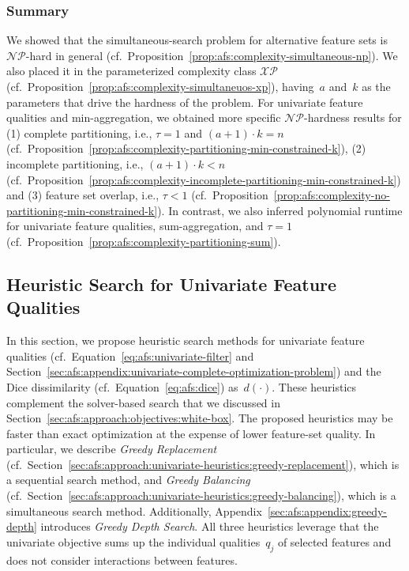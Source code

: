 \documentclass{article}
\theoremstyle{definition}
\begin{document}
\subsubsection{Summary}
\label{sec:afs:approach:complexity:summary}

We showed that the simultaneous-search problem for alternative feature sets is $\mathcal{NP}$-hard in general (cf.~Proposition~\ref{prop:afs:complexity-simultaneous-np}).
We also placed it in the parameterized complexity class $\mathcal{XP}$ (cf.~Proposition~\ref{prop:afs:complexity-simultaneuos-xp}), having~$a$ and~$k$ as the parameters that drive the hardness of the problem.
For univariate feature qualities and min-aggregation, we obtained more specific $\mathcal{NP}$-hardness results for (1) complete partitioning, i.e., $\tau = 1$ and $(a+1) \cdot k = n$ (cf.~Proposition~\ref{prop:afs:complexity-partitioning-min-constrained-k}), (2) incomplete partitioning, i.e., $(a+1) \cdot k < n$ (cf.~Proposition~\ref{prop:afs:complexity-incomplete-partitioning-min-constrained-k}) and (3) feature set overlap, i.e., $\tau < 1$ (cf.~Proposition~\ref{prop:afs:complexity-no-partitioning-min-constrained-k}).
In contrast, we also inferred polynomial runtime for univariate feature qualities, sum-aggregation, and $\tau = 1$ (cf.~Proposition~\ref{prop:afs:complexity-partitioning-sum}).

\subsection{Heuristic Search for Univariate Feature Qualities}
\label{sec:afs:approach:univariate-heuristics}

In this section, we propose heuristic search methods for univariate feature qualities (cf.~Equation~\ref{eq:afs:univariate-filter} and Section~\ref{sec:afs:appendix:univariate-complete-optimization-problem}) and the Dice dissimilarity (cf.~Equation~\ref{eq:afs:dice}) as~$d(\cdot)$.
These heuristics complement the solver-based search that we discussed in Section~\ref{sec:afs:approach:objectives:white-box}.
The proposed heuristics may be faster than exact optimization at the expense of lower feature-set quality.
In particular, we describe \emph{Greedy Replacement} (cf.~Section~\ref{sec:afs:approach:univariate-heuristics:greedy-replacement}), which is a sequential search method, and \emph{Greedy Balancing} (cf.~Section~\ref{sec:afs:approach:univariate-heuristics:greedy-balancing}), which is a simultaneous search method.
Additionally, Appendix~\ref{sec:afs:appendix:greedy-depth} introduces \emph{Greedy Depth Search}.
All three heuristics leverage that the univariate objective sums up the individual qualities~$q_j$ of selected features and does not consider interactions between features.
\end{document}
